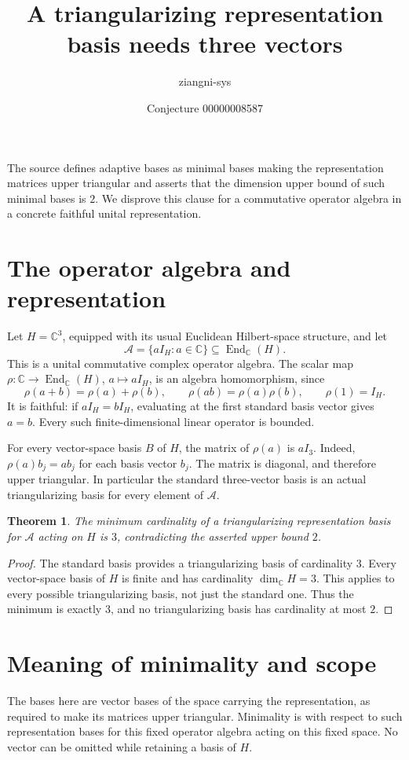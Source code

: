 \documentclass[11pt]{article}
\title{A triangularizing representation basis needs three vectors}
\author{ziangni-sys}
\date{Conjecture 00000008587}
\newtheorem{theorem}{Theorem}
\begin{document}
\sloppy
\maketitle
\noindent The source defines adaptive bases as minimal bases making the
representation matrices upper triangular and asserts that the dimension
upper bound of such minimal bases is $2$. We disprove this clause for a
commutative operator algebra in a concrete faithful unital representation.

\section*{The operator algebra and representation}
Let $H=\mathbb C^3$, equipped with its usual Euclidean Hilbert-space structure,
and let
\[
 \mathcal A=\{a I_H:a\in\mathbb C\}\subseteq\operatorname{End}_{\mathbb C}(H).
\]
This is a unital commutative complex operator algebra. The scalar map
$\rho:\mathbb C\to\operatorname{End}_{\mathbb C}(H)$, $a\mapsto a I_H$,
is an algebra homomorphism, since
\[
 \rho(a+b)=\rho(a)+\rho(b),\qquad
 \rho(ab)=\rho(a)\rho(b),\qquad \rho(1)=I_H.
\]
It is faithful: if $a I_H=b I_H$, evaluating at the first standard basis
vector gives $a=b$. Every such finite-dimensional linear operator is bounded.

For every vector-space basis $B$ of $H$, the matrix of $\rho(a)$ is $a I_3$.
Indeed, $\rho(a)b_j=ab_j$ for each basis vector $b_j$. The matrix is diagonal,
and therefore upper triangular. In particular the standard three-vector
basis is an actual triangularizing basis for every element of $\mathcal A$.

\begin{theorem}
The minimum cardinality of a triangularizing representation basis for
$\mathcal A$ acting on $H$ is $3$, contradicting the asserted upper bound $2$.
\end{theorem}
\begin{proof}
The standard basis provides a triangularizing basis of cardinality $3$.
Every vector-space basis of $H$ is finite and has cardinality
$\dim_{\mathbb C}H=3$. This applies to every possible triangularizing basis,
not just the standard one. Thus the minimum is exactly $3$, and no
triangularizing basis has cardinality at most $2$.
\end{proof}

\section*{Meaning of minimality and scope}
The bases here are vector bases of the space carrying the representation,
as required to make its matrices upper triangular. Minimality is with
respect to such representation bases for this fixed operator algebra
acting on this fixed space. No vector can be omitted while retaining a
basis of $H$.
\end{document}

